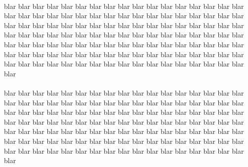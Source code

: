 \documentclass[twocolumn]{article}
\begin{document}

\paragraph*{}
blar blar blar blar blar blar blar blar blar blar blar blar blar blar blar
blar blar blar blar blar blar blar blar blar blar blar blar blar blar blar
blar blar blar blar blar blar blar blar blar blar blar blar blar blar blar
blar blar blar blar blar blar blar blar blar blar blar blar blar blar blar
blar blar blar blar blar blar blar blar blar blar blar blar blar blar blar
blar blar blar blar blar blar blar blar blar blar blar blar blar blar blar
blar blar blar blar blar blar blar blar blar blar blar blar blar blar blar
blar blar blar blar blar blar blar blar blar blar blar blar blar blar blar


\paragraph*{}
blar blar blar blar blar blar blar blar blar blar blar blar blar blar blar
blar blar blar blar blar blar blar blar blar blar blar blar blar blar blar
blar blar blar blar blar blar blar blar blar blar blar blar blar blar blar
blar blar blar blar blar blar blar blar blar blar blar blar blar blar blar
blar blar blar blar blar blar blar blar blar blar blar blar blar blar blar
blar blar blar blar blar blar blar blar blar blar blar blar blar blar blar
blar blar blar blar blar blar blar blar blar blar blar blar blar blar blar
blar blar blar blar blar blar blar blar blar blar blar blar blar blar blar
\end{document}
